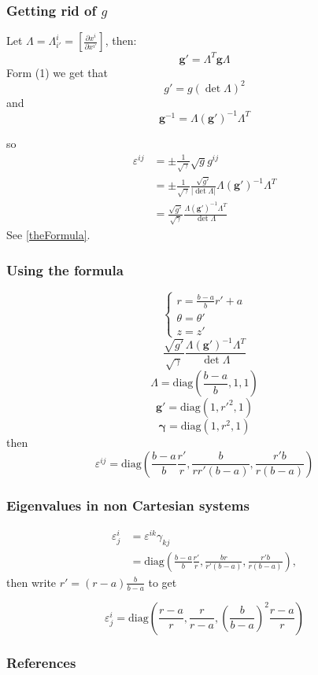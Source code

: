 \documentclass{beamer}
\begin{document}
\begin{frame}
\frametitle{Getting rid of \(g\)}
Let \(\Lambda=\Lambda^i_{i'}=\left[\frac{\partial x^i}{\partial x^{i'}}\right]\), then:
\begin{equation}
\boldsymbol{g}'=\Lambda^T \boldsymbol{g} \Lambda
\end{equation}
Form (1) we get that 
\[g'=g\left(\det\Lambda\right)^2\]
and
\[
\boldsymbol{g}^{-1}=\Lambda(\boldsymbol{g}')^{-1}\Lambda^T
\]

so
\begin{align*}
\varepsilon^{ij}&=\pm\frac{1}{\sqrt{\gamma}}\sqrt{g}g^{ij}\\
		&=\pm\frac{1}{\sqrt{\gamma}}\frac{\sqrt{g'}}{|\det\Lambda|}\Lambda(\boldsymbol{g}')^{-1}\Lambda^T\\
		&=\frac{\sqrt{g'}}{\sqrt{\gamma}}\frac{\Lambda(\boldsymbol{g}')^{-1}\Lambda^T}{\det\Lambda}
\end{align*}
See \ref{theFormula}.
\end{frame}

\begin{frame}
\frametitle{Using the formula}
\[\begin{cases}
r= \frac{b-a}{b} r' + a\\
\theta = \theta'\\
z=z'
\end{cases}\]
\[
\frac{\sqrt{g'}}{\sqrt{\gamma}}\frac{\Lambda(\boldsymbol{g}')^{-1}\Lambda^T}{\det\Lambda}
\]
\[\Lambda=\text{diag}\left( \frac{b-a}{b} ,1,1\right)\]
\[\boldsymbol{g}'=\text{diag}(1,r'^2,1)\]
\[\boldsymbol{\gamma}=\text{diag}\left(1,r^2,1\right)\]
then
\[
\varepsilon^{ij}=\text{diag}
\left(
\frac{b-a}{b}\frac{r'}{r},
\frac{b}{rr'(b-a)},
\frac{r'b}{r(b-a)}
\right)
\]

\end{frame}

\begin{frame}
\frametitle{Eigenvalues in non Cartesian systems}
\begin{align*}
\varepsilon^i_j&=\varepsilon^{ik}\gamma_{kj}\\
&=\text{diag}
\left(
\frac{b-a}{b}\frac{r'}{r},
\frac{br}{r'(b-a)},
\frac{r'b}{r(b-a)}
\right),
\end{align*}
then write \(r'=(r-a)\frac{b}{b-a}\) to get
\begin{framed}
\[
\varepsilon^i_j =\text{diag}
\left(
\frac{r-a}{r},
\frac{r}{r-a},
\left(\frac{b}{b-a}\right)^2\frac{r-a}{r}
\right)
\]
\end{framed}
\end{frame}

\begin{frame}
\frametitle{References}
\end{frame}
\end{document}
